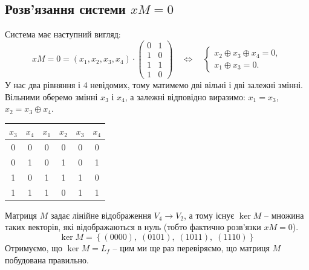 \subsection{Розв'язання системи \texorpdfstring{$xM = 0$}{xM}}
Система має наступний вигляд:
\begin{equation*}
    xM = 0 = (x_{1}, x_{2}, x_{3}, x_{4}) \cdot \begin{pmatrix}
        0 & 1 \\
        1 & 0 \\
        1 & 1 \\
        1 & 0
    \end{pmatrix} \quad\Longleftrightarrow\quad
    \begin{cases}
        x_{2} \oplus x_{3} \oplus x_{4} = 0, \\
        x_{1} \oplus x_{3} = 0.
    \end{cases}
\end{equation*}
У нас два рівняння і 4 невідомих, тому матимемо дві вільні і дві залежні змінні. Вільними оберемо змінні 
$x_{3}$ і $x_{4}$, а залежні відповідно виразимо: $x_{1} = x_{3}$, $x_{2} = x_{3} \oplus x_{4}$.
\begin{center}
    \renewcommand{\arraystretch}{1.2}
    \begin{tabular}{cc|cccc}
        $x_{3}$ & $x_{4}$ & $x_{1}$ & $x_{2}$ & $x_{3}$ & $x_{4}$ \\
        \hline
        0       & 0       & 0       & 0       & 0       & 0       \\
        0       & 1       & 0       & 1       & 0       & 1       \\
        1       & 0       & 1       & 1       & 1       & 0       \\
        1       & 1       & 1       & 0       & 1       & 1       \\
    \end{tabular}
\end{center}
Матриця $M$ задає лінійне відображення $V_{4} \rightarrow V_{2}$, а тому існує $\ker M$ -- множина таких векторів, 
які відображаються в нуль (тобто фактично розв'язки $xM = 0$).
\begin{equation*}
    \ker M = \left\{(0000),\; (0101),\; (1011),\; (1110)\right\}
\end{equation*}
Отримуємо, що $\ker M = L_{f}$ -- цим ми ще раз перевіряємо, що матриця $M$ побудована правильно.

